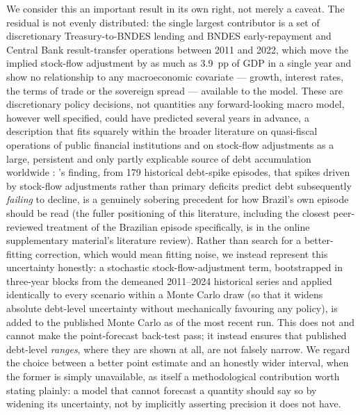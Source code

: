 \documentclass[11pt,a4paper]{article}
\begin{document}
We consider this an important result in its own right, not merely a caveat. The residual is not evenly distributed: the single largest contributor is a set of discretionary Treasury-to-BNDES lending and BNDES early-repayment and Central Bank result-transfer operations between 2011 and 2022, which move the implied stock-flow adjustment by as much as 3.9~pp of GDP in a single year and show no relationship to any macroeconomic covariate --- growth, interest rates, the terms of trade or the sovereign spread --- available to the model. These are discretionary policy decisions, not quantities any forward-looking macro model, however well specified, could have predicted several years in advance, a description that fits squarely within the broader literature on quasi-fiscal operations of public financial institutions \citep{mackenziestella1996} and on stock-flow adjustments as a large, persistent and only partly explicable source of debt accumulation worldwide \citep{weber2012sfa,seiferling2013}: \citet{jaramilloetal2017}'s finding, from 179 historical debt-spike episodes, that spikes driven by stock-flow adjustments rather than primary deficits predict debt subsequently \emph{failing} to decline, is a genuinely sobering precedent for how Brazil's own episode should be read (the fuller positioning of this literature, including the closest peer-reviewed treatment of the Brazilian episode specifically, is in the online supplementary material's literature review). Rather than search for a better-fitting correction, which would mean fitting noise, we instead represent this uncertainty honestly: a stochastic stock-flow-adjustment term, bootstrapped in three-year blocks from the demeaned 2011--2024 historical series and applied identically to every scenario within a Monte Carlo draw (so that it widens absolute debt-level uncertainty without mechanically favouring any policy), is added to the published Monte Carlo as of the most recent run. This does not and cannot make the point-forecast back-test pass; it instead ensures that published debt-level \emph{ranges}, where they are shown at all, are not falsely narrow. We regard the choice between a better point estimate and an honestly wider interval, when the former is simply unavailable, as itself a methodological contribution worth stating plainly: a model that cannot forecast a quantity should say so by widening its uncertainty, not by implicitly asserting precision it does not have.
\end{document}
